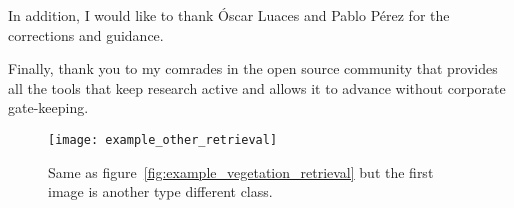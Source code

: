 \documentclass[conference]{IEEEtran}
\begin{document}
    In addition, I would like to thank Óscar Luaces and Pablo Pérez for the corrections and guidance.

    Finally, thank you to my comrades in the open source community that provides all the tools that keep research active and allows it to advance without corporate gate-keeping.




    \begin{figure}[t]
        \centering
        \texttt{[image: example\_other\_retrieval]}
        \caption{Same as figure~\ref{fig:example_vegetation_retrieval} but the first image is another type different class.}
        \label{fig:example_other_retrieval}
    \end{figure}
    
\end{document}
